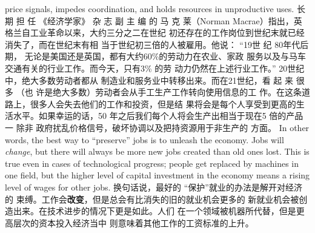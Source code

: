 \begin{paracol}{2}
price signals, impedes coordination, and holds resources in unproductive uses.
\switchcolumn
长 期 担 任 《经济学家》 杂 志 副 主 编 的 马 克 莱（Norman Macrae）指出，英格兰自工业革命以来，大约三分之二在世纪
初还存在的工作岗位到世纪末就已经消失了，而在世纪末有相
当于世纪初三倍的人被雇用。他说： “19世 纪 80年代后期，
无论是美国还是英国，都有大约60\%的劳动力在农业、家政
服务以及与马车交通有关的行业工作。而今天，只有3\% 的劳
动力仍然在上述行业工作。” 20世纪中，绝大多数劳动者都从
制造业和服务业中转移出来。而在21世纪，看 起 来 很 多 （也
许是绝大多数）劳动者会从手工生产工作转向使用信息的工
作。在这条道路上，很多人会失去他们的工作和投资，但是结
果将会是每个人享受到更高的生活水平。如果幸运的话，50
年之后我们每个人将会生产出相当于现在5 倍的产品一 除非
政府扰乱价格信号，破坏协调以及把持资源用于非生产的
方面。
\switchcolumn*
In other words, the best way to ``preserve'' jobs is to unleash
the economy. Jobs will \textit{change}, but there will always be more
new jobs created than old ones lost. This is true even in cases of
technological progress; people get replaced by machines in one
field, but the higher level of capital investment in the economy
means a rising level of wages for other jobs.
\switchcolumn
换句话说，最好的 “保护”就业的办法是解开对经济的
束缚。工作会\textbf{改变}，但是总会有比消失的旧的就业机会更多的
新就业机会被创造出来。在技术进步的情况下更是如此。人们
在一个领域被机器所代替，但是更高层次的资本投入经济当中
则意味着其他工作的工资标准的上升。


\end{paracol}
